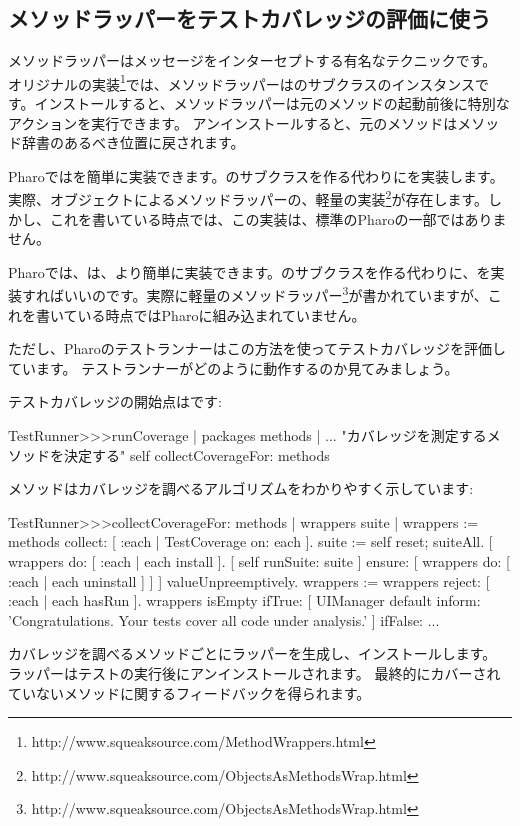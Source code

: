 \documentclass[a4paper,10pt,twoside]{book}
\begin{document}
\subsection{メソッドラッパーをテストカバレッジの評価に使う}

メソッドラッパーはメッセージをインターセプトする有名なテクニックです\cite{Bran98a}。
オリジナルの実装\footnote{http://www.squeaksource.com/MethodWrappers.html}では、メソッドラッパーはのサブクラスのインスタンスです。インストールすると、メソッドラッパーは元のメソッドの起動前後に特別なアクションを実行できます。
アンインストールすると、元のメソッドはメソッド辞書のあるべき位置に戻されます。

Pharoではを簡単に実装できます。のサブクラスを作る代わりにを実装します。実際、オブジェクトによるメソッドラッパーの、軽量の実装\footnote{http://www.squeaksource.com/ObjectsAsMethodsWrap.html}が存在します。しかし、これを書いている時点では、この実装は、標準のPharoの一部ではありません。

Pharoでは、は、より簡単に実装できます。のサブクラスを作る代わりに、を実装すればいいのです。実際に軽量のメソッドラッパー\footnote{http://www.squeaksource.com/ObjectsAsMethodsWrap.html}が書かれていますが、これを書いている時点ではPharoに組み込まれていません。

ただし、Pharoのテストランナーはこの方法を使ってテストカバレッジを評価しています。
テストランナーがどのように動作するのか見てみましょう。

テストカバレッジの開始点はです:
\begin{code}{}
TestRunner>>>runCoverage
	| packages methods |
	... "カバレッジを測定するメソッドを決定する"
	self collectCoverageFor: methods
\end{code}

メソッドはカバレッジを調べるアルゴリズムをわかりやすく示しています:
\begin{code}{}
TestRunner>>>collectCoverageFor: methods
	| wrappers suite |
	wrappers := methods collect: [ :each | TestCoverage on: each ].
	suite := self
		reset;
		suiteAll.
	[ wrappers do: [ :each | each install ].
	  [ self runSuite: suite ] ensure: [ wrappers do: [ :each | each uninstall ] ] ] valueUnpreemptively.
	wrappers := wrappers reject: [ :each | each hasRun ].
	wrappers isEmpty 
		ifTrue: 
			[ UIManager default inform: 'Congratulations. Your tests cover all code under analysis.' ]
		ifFalse: ...
\end{code}
カバレッジを調べるメソッドごとにラッパーを生成し、インストールします。
ラッパーはテストの実行後にアンインストールされます。
最終的にカバーされていないメソッドに関するフィードバックを得られます。
\end{document}
